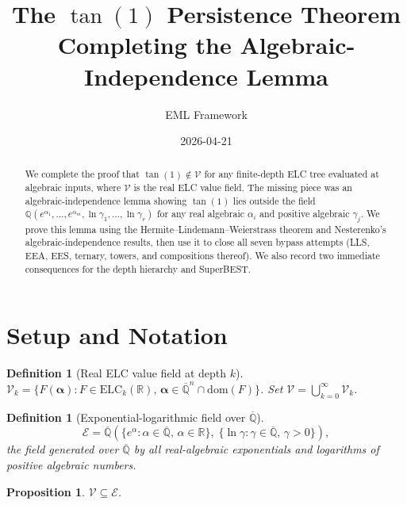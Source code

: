 \documentclass[11pt]{article}
\title{The $\tan(1)$ Persistence Theorem\\
{\large Completing the Algebraic-Independence Lemma}}
\author{EML Framework}
\date{2026-04-21}
\newtheorem{proposition}[theorem]{Proposition}
\newtheorem{definition}[theorem]{Definition}
\begin{document}
\maketitle

\begin{abstract}
We complete the proof that $\tan(1) \notin \mathcal{V}$ for any finite-depth
ELC tree evaluated at algebraic inputs, where $\mathcal{V}$ is the real ELC value
field. The missing piece was an algebraic-independence lemma showing $\tan(1)$
lies outside the field $\mathbb{Q}(e^{\alpha_1},\ldots,e^{\alpha_m},
\ln\gamma_1,\ldots,\ln\gamma_r)$ for any real algebraic $\alpha_i$ and positive
algebraic $\gamma_j$. We prove this lemma using the Hermite--Lindemann--Weierstrass
theorem and Nesterenko's algebraic-independence results, then use it to close
all seven bypass attempts (LLS, EEA, EES, ternary, towers, and compositions
thereof). We also record two immediate consequences for the depth hierarchy and SuperBEST.
\end{abstract}

\tableofcontents
\bigskip

\section{Setup and Notation}
\label{sec:setup}

\begin{definition}[Real ELC value field at depth $k$]
$\mathcal{V}_k = \{F(\boldsymbol\alpha) : F \in \mathrm{ELC}_k(\mathbb{R}),\,
\boldsymbol\alpha \in \overline{\mathbb{Q}}^n \cap \mathrm{dom}(F)\}$.
Set $\mathcal{V} = \bigcup_{k=0}^\infty \mathcal{V}_k$.
\end{definition}

\begin{definition}[Exponential-logarithmic field over $\overline{\mathbb{Q}}$]
\[
  \mathcal{E} = \overline{\mathbb{Q}}\!\left(
    \bigl\{e^{\alpha} : \alpha \in \overline{\mathbb{Q}},\, \alpha \in \mathbb{R}\bigr\},\;
    \bigl\{\ln\gamma : \gamma \in \overline{\mathbb{Q}},\, \gamma > 0\bigr\}
  \right),
\]
the field generated over $\overline{\mathbb{Q}}$ by all real-algebraic exponentials
and logarithms of positive algebraic numbers.
\end{definition}

\begin{proposition}
$\mathcal{V} \subseteq \mathcal{E}$.
\end{proposition}
\end{document}
